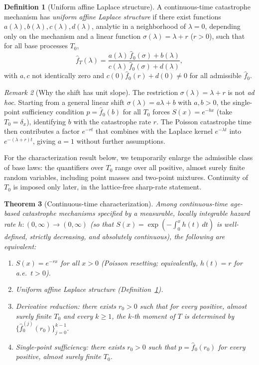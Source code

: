 \documentclass[11pt]{article}
\theoremstyle{plain}
\newtheorem{theorem}{Theorem}[section]
\theoremstyle{definition}
\newtheorem{definition}[theorem]{Definition}
\theoremstyle{remark}
\newtheorem{remark}[theorem]{Remark}
\begin{document}
\begin{definition}[Uniform affine Laplace structure]\label{def:ct-affine}
A continuous-time catastrophe mechanism has \emph{uniform affine Laplace structure} if there exist functions \(a(\lambda),b(\lambda),c(\lambda),d(\lambda)\), analytic in a neighborhood of \(\lambda=0\), depending only on the mechanism and a linear function $\sigma(\lambda) = \lambda + r$ ($r > 0$), such that for all base processes $T_0$,
\[
  \hat{f}_T(\lambda) = \frac{a(\lambda)\,\hat{f}_0(\sigma) + b(\lambda)}{c(\lambda)\,\hat{f}_0(\sigma) + d(\lambda)},
\]
with $a, c$ not identically zero and $c(0)\hat{f}_0(r) + d(0) \neq 0$ for all admissible $\hat{f}_0$.
\end{definition}

\begin{remark}[Why the shift has unit slope]\label{rem:unit-slope}
The restriction $\sigma(\lambda) = \lambda + r$ is not \emph{ad hoc}.  Starting from a general linear shift $\sigma(\lambda) = a\lambda + b$ with $a, b > 0$, the single-point sufficiency condition $p = \hat{f}_0(b)$ for all $T_0$ forces $S(x) = e^{-bx}$ (take $T_0 = \delta_x$), identifying $b$ with the catastrophe rate $r$.  The Poisson catastrophe time then contributes a factor $e^{-rt}$ that combines with the Laplace kernel $e^{-\lambda t}$ into $e^{-(\lambda+r)t}$, giving $a = 1$ without further assumptions.
\end{remark}

For the characterization result below, we temporarily enlarge the admissible
class of base laws: the quantifiers over $T_0$ range over all positive,
almost surely finite random variables, including point masses and two-point
mixtures.  Continuity of $T_0$ is imposed only later, in the lattice-free
sharp-rate statement.


\begin{theorem}[Continuous-time characterization]\label{thm:ct-char}
Among continuous-time age-based catastrophe mechanisms specified by a measurable, locally integrable hazard rate $h: (0,\infty) \to (0,\infty)$ (so that $S(x) = \exp(-\int_0^x h(t)\,dt)$ is well-defined, strictly decreasing, and absolutely continuous), the following are equivalent:
\begin{enumerate}[\rm (a)]
  \item $S(x) = e^{-rx}$ for all $x > 0$ (Poisson resetting; equivalently,
  $h(t) = r$ for a.e.\ $t > 0$).
  \item Uniform affine Laplace structure (Definition~\ref{def:ct-affine}).
  \item Derivative reduction: there exists $r_0 > 0$ such that for every
  positive, almost surely finite $T_0$ and every $k \ge 1$, the $k$-th
  moment of $T$ is determined by
  $\{\hat f_0^{(j)}(r_0)\}_{j=0}^{k-1}$.
  \item Single-point sufficiency: there exists $r_0 > 0$ such that
  $p = \hat f_0(r_0)$ for every positive, almost surely finite $T_0$.
\end{enumerate}
\end{theorem}
\end{document}
